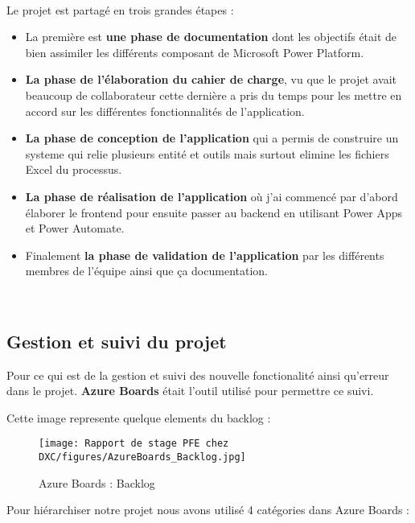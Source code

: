 \\
Le projet est partagé en trois grandes étapes : 
\\
\begin{itemize}
  \item La première est \textbf{une phase de documentation} dont les objectifs était de bien assimiler les différents composant de Microsoft Power Platform.
  \\
  \item \textbf{La phase de l'élaboration du cahier de charge}, vu que le projet avait beaucoup de collaborateur cette dernière a pris du temps pour les mettre en accord sur les différentes fonctionnalités de l'application.
  \\
  \item \textbf{La phase de conception de l'application} qui a permis de construire un systeme qui relie plusieurs entité et outils mais surtout elimine les fichiers Excel du processus.
  \\
  \item \textbf{La phase de réalisation de l'application} où j'ai commencé par d'abord élaborer le frontend pour ensuite passer au backend en utilisant Power Apps et Power Automate.
  \\
  \item Finalement \textbf{la phase de validation de l'application} par les différents membres de l'équipe ainsi que ça documentation.
  \\
\end{itemize}
\\

\subsection{Gestion et suivi du projet}
Pour ce qui est de la gestion et suivi des nouvelle fonctionalité ainsi qu'erreur dans le projet. \textbf{Azure Boards} était l'outil utilisé pour permettre ce suivi.

Cette image represente quelque elements du backlog :

\begin{figure}[!h]
    \centering
    \texttt{[image: Rapport de stage PFE chez DXC/figures/AzureBoards\_Backlog.jpg]}
    \caption{Azure Boards : Backlog}
\end{figure}

Pour hiérarchiser notre projet nous avons utilisé 4 catégories dans Azure Boards :
\\

